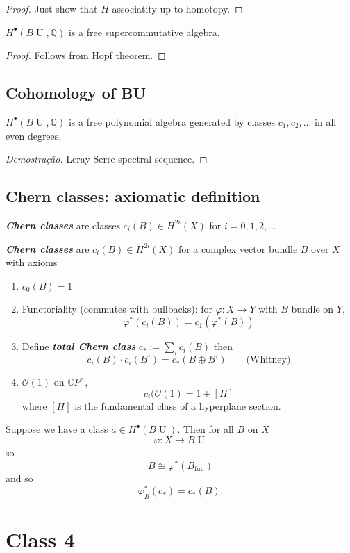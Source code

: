 \begin{proof}
	Just show that $H$-associatity up to homotopy.
\end{proof}

\begin{coro}
	$H^\bullet(B\operatorname{U},\mathbb{Q})$ is a free supercommutative algebra.
\end{coro}
\begin{proof}
	Follows from Hopf theorem.
\end{proof}

\subsection{Cohomology of BU}

\begin{claim}
	$H^\bullet(B\operatorname{U},\mathbb{Q})$ is a free polynomial algebra generated by classes $c_1,c_2,\ldots$ in all even degrees.
\end{claim}

\begin{proof}[Demostra\c c\~ao]
	Leray-Serre spectral sequence.
\end{proof}

\subsection{Chern classes: axiomatic definition}

\begin{defn}
	\textit{\textbf{Chern classes}} are classes  $c_i(B)\in H^{2i}(X)$ for $i=0,1,2,\ldots$

	\textit{\textbf{Chern classes}} are  $c_i(B)\in H^{2i}(X)$ for a complex vector bundle $B$ over $X$ with axioms

	\begin{enumerate}[label=\alph*.]
		\item $c_0(B)=1$

		\item Functoriality (commutes with bullbacks): for $\varphi:X\to Y$ with $B$ bundle on $Y$, 
			 \[\varphi^*(c_i(B))=c_1(\varphi^*(B))\]

		\item Define \textit{\textbf{total Chern class}}  $c_{*}:=\sum_{i}c_i(B)$ then
			\[c_i(B)\cdot c_i(B')=c_*(B\oplus B')\qquad \text{(Whitney)} \]

		\item $\mathcal{O}(1)$ on $\mathbb{C}P^{n}$,
			\[c_i(\mathcal{O}(1)=1+[H]\]
			where $[H]$ is the fundamental class of a hyperplane section.
	\end{enumerate}
\end{defn}

Suppose we have a class $a\in H^{\bullet}(B\operatorname{U})$. Then for all $B$ on $X$ 
\[\varphi:X\to B\operatorname{U}\]
so
\[B\cong \varphi^* (B_{\operatorname{fun}})\]
and so
\[\varphi^*_B(c_*)=c_*(B).\]





\section{Class 4}






